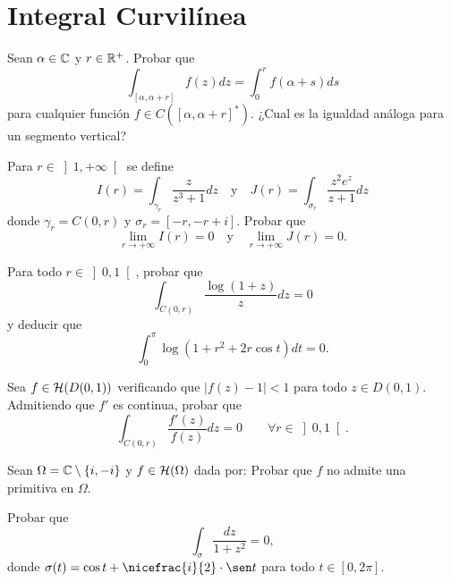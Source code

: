 \section{Integral Curvilínea}

\begin{ejercicio}
    Sean $\alpha \in \mathbb{C}$ y $r \in \mathbb{R}^+$. Probar que
    \[
        \int_{[\alpha,\alpha+r]} f(z)dz = \int_{0}^{r} f(\alpha+s)ds
    \]
    para cualquier función $f \in C\left([\alpha,\alpha+r]^*\right)$.
    ¿Cual es la igualdad análoga para un segmento vertical?
\end{ejercicio}

\begin{ejercicio}
    Para $r \in \left]1,+\infty\right[$ se define
    \[
        I(r) = \int_{\gamma_r} \frac{z}{z^3+1}dz
        \quad \text{y} \quad
        J(r) = \int_{\sigma_r} \frac{z^2 e^z}{z+1}dz
    \]
    donde $\gamma_r = C(0,r)$ y $\sigma_r = [-r,-r+i]$. Probar que
    \[
        \lim_{r\to+\infty} I(r) = 0
        \quad \text{y} \quad
        \lim_{r\to+\infty} J(r) = 0.
    \]
\end{ejercicio}

\begin{ejercicio}
    Para todo $r \in \left]0,1\right[$, probar que
    \[
        \int_{C(0,r)} \frac{\log(1+z)}{z}dz = 0
    \]
    y deducir que
    \[
        \int_{0}^{\pi} \log(1+r^2 + 2r\cos t)dt = 0.
    \]
\end{ejercicio}

\begin{ejercicio}
    Sea $f \in \mathcal{H}(D(0,1))$ verificando que $|f(z)-1| < 1$ para todo $z \in D(0,1)$. Admitiendo que $f'$ es continua, probar que
    \[
        \int_{C(0,r)} \frac{f'(z)}{f(z)}dz = 0\qquad \forall r \in \left]0,1\right[.
    \]
\end{ejercicio}


\begin{ejercicio}
    Sean $\Omega = \mathbb{C}\setminus\{i,-i\}$ y $f \in \mathcal{H}(\Omega)$ dada por:
    Probar que $f$ no admite una primitiva en $\Omega$.
\end{ejercicio}

\begin{ejercicio}
    Probar que
    \[
        \int_{\sigma} \frac{dz}{1+z^2} = 0,
    \]
    donde $\sigma(t) = \cos t + \nicefrac{i}{2}\cdot \sen t$ para todo $t \in [0,2\pi]$.
\end{ejercicio}